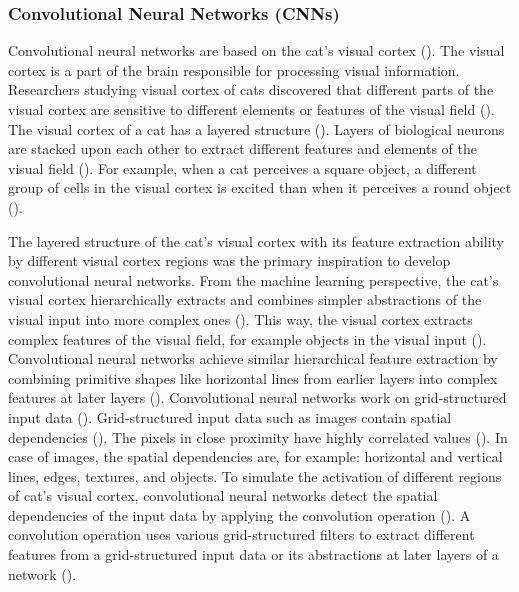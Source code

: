 \documentclass{BachelorBUI}
\begin{document}
        \subsubsection{Convolutional Neural Networks (CNNs)}
        \label{subsub:convolutional-neural-networks}

        Convolutional neural networks are based on the cat's visual cortex (\cite{Aggarwal:2018}). The visual cortex is a part of the brain responsible for processing visual information. Researchers studying visual cortex of cats discovered that different parts of the visual cortex are sensitive to different elements or features of the visual field (\cite{Aggarwal:2018}). The visual cortex of a cat has a layered structure (\cite{Aggarwal:2018}). Layers of biological neurons are stacked upon each other to extract different features and elements of the visual field (\cite{Aggarwal:2018}). For example, when a cat perceives a square object, a different group of cells in the visual cortex is excited than when it perceives a round object (\cite{Aggarwal:2018}).

        The layered structure of the cat's visual cortex with its feature extraction ability by different visual cortex regions was the primary inspiration to develop convolutional neural networks. From the machine learning perspective, the cat's visual cortex hierarchically extracts and combines simpler abstractions of the visual input into more complex ones (\cite{Aggarwal:2018}). This way, the visual cortex extracts complex features of the visual field, for example objects in the visual input (\cite{Aggarwal:2018}). Convolutional neural networks achieve similar hierarchical feature extraction by combining primitive shapes like horizontal lines from earlier layers into complex features at later layers (\cite{Aggarwal:2018}). Convolutional neural networks work on grid-structured input data (\cite{Aggarwal:2018}). Grid-structured input data such as images contain spatial dependencies (\cite{Aggarwal:2018}). The pixels in close proximity have highly correlated values (\cite{Bishop:2024}). In case of images, the spatial dependencies are, for example: horizontal and vertical lines, edges, textures, and objects. To simulate the activation of different regions of cat's visual cortex, convolutional neural networks detect the spatial dependencies of the input data by applying the convolution operation (\cite{Aggarwal:2018}). A convolution operation uses various grid-structured filters to extract different features from a grid-structured input data or its abstractions at later layers of a network (\cite{Aggarwal:2018}).
\end{document}
